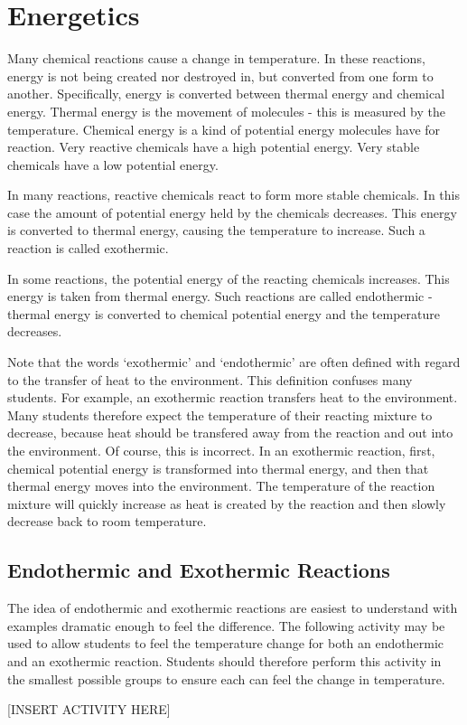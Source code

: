 \section{Energetics}

Many chemical reactions cause a change in temperature. In these reactions, energy is not being created nor destroyed in, but converted from one form to another. Specifically, energy is converted between thermal energy and chemical energy. Thermal energy is the movement of molecules - this is measured by the temperature. Chemical energy is a kind of potential energy molecules have for reaction. Very reactive chemicals have a high potential energy. Very stable chemicals have a low potential energy.

In many reactions, reactive chemicals react to form more stable chemicals. In this case the amount of potential energy held by the chemicals decreases. This energy is converted to thermal energy, causing the temperature to increase. Such a reaction is called exothermic.

In some reactions, the potential energy of the reacting chemicals increases. This energy is taken from thermal energy. Such reactions are called endothermic - thermal energy is converted to chemical potential energy and the temperature decreases.

Note that the words `exothermic' and `endothermic' are often defined with regard to the transfer of heat to the environment. This definition confuses many students. For example, an exothermic reaction transfers heat to the environment. Many students therefore expect the temperature of their reacting mixture to decrease, because heat should be transfered away from the reaction and out into the environment. Of course, this is incorrect. In an exothermic reaction, first, chemical potential energy is transformed into thermal energy, and then that thermal energy moves into the environment. The temperature of the reaction mixture will quickly increase as heat is created by the reaction and then slowly decrease back to room temperature.

\subsection{Endothermic and Exothermic Reactions}

The idea of endothermic and exothermic reactions are easiest to understand with examples dramatic enough to feel the difference. The following activity may be used to allow students to feel the temperature change for both an endothermic and an exothermic reaction. Students should therefore perform this activity in the smallest possible groups to ensure each can feel the change in temperature.

[INSERT ACTIVITY HERE]

